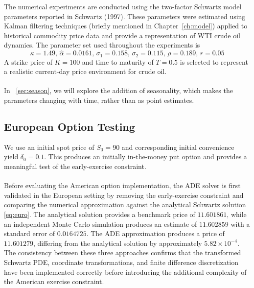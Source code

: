 \documentclass[12pt,a4paper]{article}
\begin{document}
The numerical experiments are conducted using the two-factor Schwartz model parameters reported in Schwartz (1997). These parameters were estimated using Kalman filtering techniques (briefly mentioned in Chapter~\ref{ch:model}) applied to historical commodity price data and provide a representation of WTI crude oil dynamics. The parameter set used throughout the experiments is
\[\kappa = 1.49, \,\hat{\alpha} = 0.0161,\,\sigma_1 = 0.158,\, \sigma_2=0.115,\,\rho=0.189,\,r=0.05\]
A strike price of $K=100$ and time to maturity of $T=0.5$ is selected to represent a realistic current-day price environment for crude oil.\\\\
In ~\ref{sec:season}, we will explore the addition of seasonality, which makes the parameters changing with time, rather than as point estimates. 

\subsection{European Option Testing}

We use an initial spot price of $S_0=90$ and corresponding initial convenience yield $\delta_0 = 0.1$. This produces an initially in-the-money put option and provides a meaningful test of the early-exercise constraint.\\\\
Before evaluating the American option implementation, the ADE solver is first validated in the European setting by removing the early-exercise constraint and comparing the numerical approximation against the analytical Schwartz solution \eqref{eq:euro}. The analytical solution provides a benchmark price of $11.601861$, while an independent Monte Carlo simulation produces an estimate of $11.602859$ with a standard error of $0.0164725$. The ADE approximation produces a price of $11.601279$, differing from the analytical solution by approximately $5.82\times10^{-4}$. The consistency between these three approaches confirms that the transformed Schwartz PDE, coordinate transformations, and finite difference discretization have been implemented correctly before introducing the additional complexity of the American exercise constraint.
\end{document}

